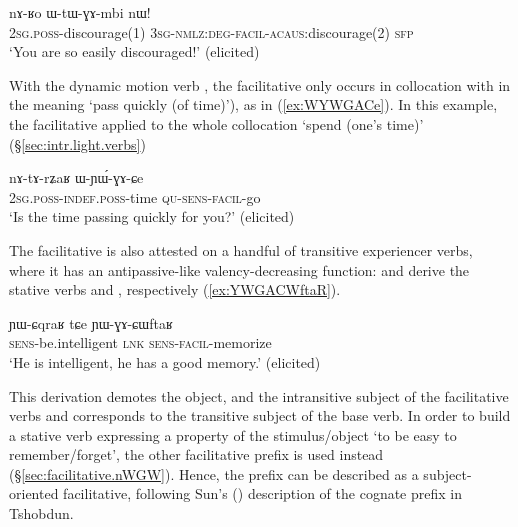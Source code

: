 \begin{exe}
\ex \label{ex:nARo.WtWGAmbi}
\gll nɤ-ʁo ɯ-tɯ-ɣɤ-mbi nɯ! \\
\textsc{2sg}.\textsc{poss}-discourage(1) \textsc{3sg}-\textsc{nmlz}:\textsc{deg}-\textsc{facil}-\textsc{acaus}:discourage(2) \textsc{sfp} \\
\glt `You are so easily discouraged!' (elicited)
\end{exe}

With the dynamic motion verb , the facilitative  only occurs in collocation with  in the meaning `pass quickly (of time)'), as in (\ref{ex:WYWGACe}). In this example, the facilitative applied to the whole collocation   `spend (one's time)' (§\ref{sec:intr.light.verbs})

\begin{exe}
\ex \label{ex:WYWGACe}
\gll nɤ-tɤ-rʑaʁ ɯ-ɲɯ́-ɣɤ-ɕe \\
\textsc{2sg}.\textsc{poss}-\textsc{indef}.\textsc{poss}-time \textsc{qu}-\textsc{sens}-\textsc{facil}-go \\
\glt `Is the time passing quickly for you?' (elicited)
\end{exe}

 The facilitative  is also attested on a handful of transitive experiencer verbs, where it has an antipassive-like valency-decreasing function:   and  derive the stative verbs   and , respectively (\ref{ex:YWGACWftaR}). 

\begin{exe}
\ex \label{ex:YWGACWftaR}
\gll ɲɯ-ɕqraʁ tɕe ɲɯ-ɣɤ-ɕɯftaʁ    \\
  \textsc{sens}-be.intelligent \textsc{lnk} \textsc{sens}-\textsc{facil}-memorize \\
 \glt `He is intelligent, he has a good memory.' (elicited)
\end{exe}

This derivation demotes the object, and the intransitive subject of the facilitative verbs  and  corresponds to the transitive subject of the base verb. In order to build a stative verb expressing a property of the stimulus/object `to be easy to remember/forget', the other facilitative prefix  is used instead (§\ref{sec:facilitative.nWGW}). Hence, the prefix  can be described as a subject-oriented facilitative, following Sun's (\citeyear{jackson14morpho}) description of the cognate prefix  in Tshobdun.
 
